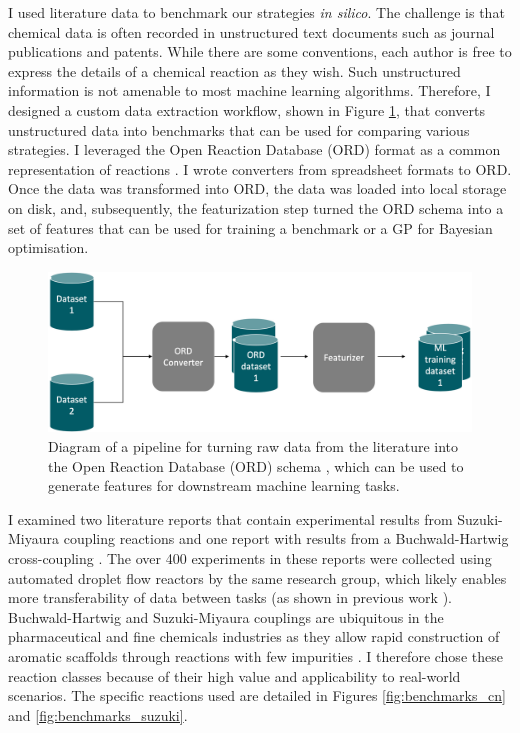 I used literature data to benchmark our strategies \textit{in silico}. The challenge is that chemical data is often recorded in unstructured text documents such as journal publications and patents. While there are some conventions, each author is free to express the details of a chemical reaction as they wish. Such unstructured information is not amenable to most machine learning algorithms. Therefore, I designed a custom data extraction workflow, shown in Figure \ref{fig:ord_pipeline}, that converts unstructured data into benchmarks that can be used for comparing various strategies. I leveraged the Open Reaction Database (ORD) format as a common representation of reactions \cite{Kearnes2021}. I wrote converters from spreadsheet formats to ORD. Once the data was transformed into ORD, the data was loaded into local storage on disk, and, subsequently, the featurization step turned the ORD schema into a set of features that can be used for training a benchmark or a GP for Bayesian optimisation.

\begin{figure}[t]
    \centering
    \includegraphics[width=\textwidth]{gfx/Chapter04/etl_pipeline.png}
    \caption{Diagram of a pipeline for turning raw data from the literature into the Open Reaction Database (ORD) schema \cite{Kearnes2021}, which can be used to generate features for downstream machine learning tasks.}
    \label{fig:ord_pipeline}
\end{figure}

I examined two literature reports that contain experimental results from Suzuki-Miyaura coupling reactions \cite{Baumgartner2018, Reizman2016b} and one report with results from a Buchwald-Hartwig cross-coupling \cite{Baumgartner2019}. The over 400 experiments in these reports were collected using automated droplet flow reactors by the same research group, which likely enables more transferability of data between tasks (as shown in previous work \cite{Schleinitz2022, Vermeire2022}). Buchwald-Hartwig and Suzuki-Miyaura couplings are ubiquitous in the pharmaceutical and fine chemicals industries as they allow rapid construction of aromatic scaffolds through reactions with few impurities \cite{Brown2016}. I therefore chose these reaction classes because of their high value and applicability to real-world scenarios. The specific reactions used are detailed in Figures \ref{fig:benchmarks_cn} and \ref{fig:benchmarks_suzuki}.


